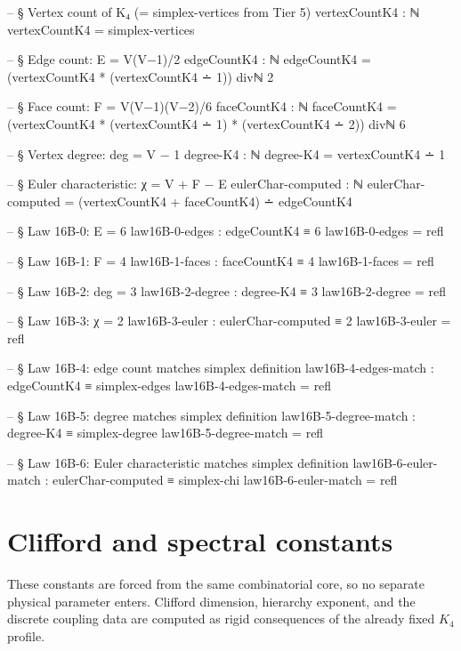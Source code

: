 \documentclass[11pt,a4paper]{book}
\begin{document}
\begin{code}
-- § Vertex count of K₄ (= simplex-vertices from Tier 5)
vertexCountK4 : ℕ
vertexCountK4 = simplex-vertices

-- § Edge count: E = V(V−1)/2
edgeCountK4 : ℕ
edgeCountK4 = (vertexCountK4 * (vertexCountK4 ∸ 1)) divℕ 2

-- § Face count: F = V(V−1)(V−2)/6
faceCountK4 : ℕ
faceCountK4 = (vertexCountK4 * (vertexCountK4 ∸ 1) * (vertexCountK4 ∸ 2)) divℕ 6

-- § Vertex degree: deg = V − 1
degree-K4 : ℕ
degree-K4 = vertexCountK4 ∸ 1

-- § Euler characteristic: χ = V + F − E
eulerChar-computed : ℕ
eulerChar-computed = (vertexCountK4 + faceCountK4) ∸ edgeCountK4

-- § Law 16B-0: E = 6
law16B-0-edges : edgeCountK4 ≡ 6
law16B-0-edges = refl

-- § Law 16B-1: F = 4
law16B-1-faces : faceCountK4 ≡ 4
law16B-1-faces = refl

-- § Law 16B-2: deg = 3
law16B-2-degree : degree-K4 ≡ 3
law16B-2-degree = refl

-- § Law 16B-3: χ = 2
law16B-3-euler : eulerChar-computed ≡ 2
law16B-3-euler = refl

-- § Law 16B-4: edge count matches simplex definition
law16B-4-edges-match : edgeCountK4 ≡ simplex-edges
law16B-4-edges-match = refl

-- § Law 16B-5: degree matches simplex definition
law16B-5-degree-match : degree-K4 ≡ simplex-degree
law16B-5-degree-match = refl

-- § Law 16B-6: Euler characteristic matches simplex definition
law16B-6-euler-match : eulerChar-computed ≡ simplex-chi
law16B-6-euler-match = refl
\end{code}

\section{Clifford and spectral constants}

These constants are forced from the same combinatorial core, so no separate physical parameter enters. Clifford dimension, hierarchy exponent, and the discrete coupling data are computed as rigid consequences of the already fixed $K_4$ profile.
\end{document}
